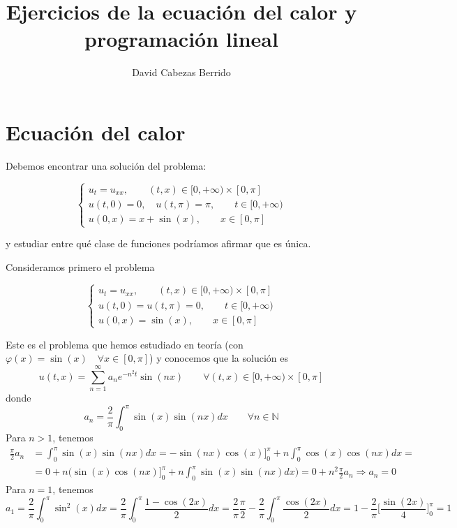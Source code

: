\documentclass[a4]{article}
\title{Ejercicios de la ecuación del calor y programación lineal}
\author{David Cabezas Berrido}
\date{\vspace{-4mm}}
\begin{document}
\maketitle

\section{Ecuación del calor}

Debemos encontrar una solución del problema:

\begin{equation} \label{eq:enunciado}
  \begin{cases}
    u_t=u_{xx}, \qquad (t,x)\in [0,+\infty)\times [0,\pi] \\
    u(t,0)=0,\quad u(t,\pi)=\pi, \qquad t\in [0,+\infty) \\
    u(0,x)=x+\sin(x), \qquad x\in [0,\pi]
  \end{cases}
\end{equation}

y estudiar entre qué clase de funciones podríamos afirmar que es
única.

Consideramos primero el problema

\begin{equation} \label{eq:homogeneo}
  \begin{cases}
    u_t=u_{xx}, \qquad (t,x)\in [0,+\infty)\times [0,\pi] \\
    u(t,0)=u(t,\pi)=0   , \qquad t\in [0,+\infty) \\
    u(0,x)=\sin(x), \qquad x\in [0,\pi]
  \end{cases}
\end{equation}

Este es el problema que hemos estudiado en teoría (con
$\varphi(x)=\sin(x)\quad\forall x\in[0,\pi]$) y conocemos que la
solución es
\begin{equation} \label{eq:sol-homogeneo}
  u(t,x)=\sum_{n=1}^\infty a_n e^{-n^2 t}\sin(nx)\qquad\forall(t,x)\in[0,+\infty)\times [0,\pi]
\end{equation}
donde
\begin{equation} \label{eq:an}
  a_n=\frac{2}{\pi}\int_0^\pi\sin(x)\sin(nx)dx\qquad\forall n\in\mathbb{N}
\end{equation}
Para $n>1$, tenemos
\begin{align*}
  \frac{\pi}{2}a_n&=\int_0^\pi\sin(x)\sin(nx)dx=-\sin(nx)\cos(x)\bigg]_0^\pi+n\int_0^\pi\cos(x)\cos(nx)dx=\\&= 0+n\bigg(\sin(x)\cos(nx)\bigg]_0^\pi+n\int_0^\pi\sin(x)\sin(nx)dx\bigg)=0+n^2\frac{\pi}{2}a_n \Longrightarrow a_n=0
\end{align*}
Para $n=1$, tenemos
\[a_1=\frac{2}{\pi}\int_0^\pi\sin^2(x)dx=\frac{2}{\pi}\int_0^\pi\frac{1-\cos(2x)}{2}dx=\frac{2}{\pi}\frac{\pi}{2}-\frac{2}{\pi}\int_0^\pi\frac{\cos(2x)}{2}dx=1-\frac{2}{\pi}\bigg[\frac{\sin(2x)}{4}\bigg]_{0}^{\pi}=1\]
\end{document}
